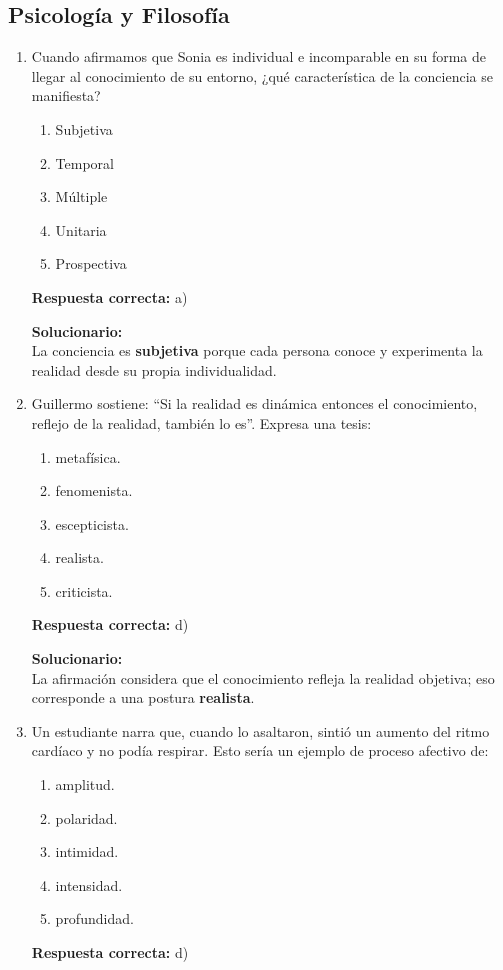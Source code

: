 \subsection*{Psicología y Filosofía}

\begin{enumerate}

	
	\item Cuando afirmamos que Sonia es individual e incomparable en su forma de llegar al conocimiento de su entorno, ¿qué característica de la conciencia se manifiesta?
	\begin{enumerate}[label=\alph*)]
		\item Subjetiva
		\item Temporal
		\item Múltiple
		\item Unitaria
		\item Prospectiva
	\end{enumerate}
	\textbf{Respuesta correcta:} a)
	
	\vspace{2mm}
	\textbf{Solucionario:}\\
	La conciencia es \textbf{subjetiva} porque cada persona conoce y experimenta la realidad desde su propia individualidad.
	
	
	
	\vspace{6mm}
	
	\item Guillermo sostiene: ``Si la realidad es dinámica entonces el conocimiento, reflejo de la realidad, también lo es''. Expresa una tesis:
	\begin{enumerate}[label=\alph*)]
		\item metafísica.
		\item fenomenista.
		\item escepticista.
		\item realista.
		\item criticista.
	\end{enumerate}
	\textbf{Respuesta correcta:} d)
	
	\vspace{2mm}
	\textbf{Solucionario:}\\
	La afirmación considera que el conocimiento refleja la realidad objetiva; eso corresponde a una postura \textbf{realista}.
	

	
	\vspace{6mm}
	
	\item Un estudiante narra que, cuando lo asaltaron, sintió un aumento del ritmo cardíaco y no podía respirar. Esto sería un ejemplo de proceso afectivo de:
	\begin{enumerate}[label=\alph*)]
		\item amplitud.
		\item polaridad.
		\item intimidad.
		\item intensidad.
		\item profundidad.
	\end{enumerate}
	\textbf{Respuesta correcta:} d)
	

\end{enumerate}
